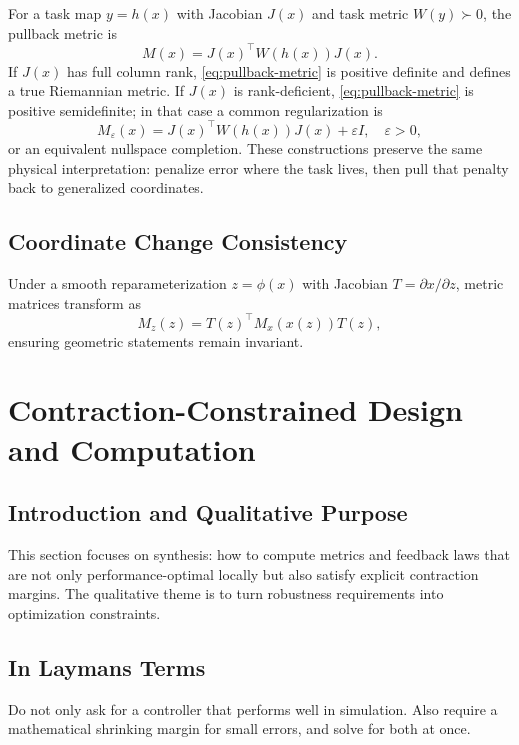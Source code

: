 \documentclass[11pt,letterpaper]{article}
\begin{document}
For a task map $y=h(x)$ with Jacobian $J(x)$ and task metric $W(y)\succ0$, the pullback metric is
\begin{equation}
M(x) = J(x)^\top W(h(x))J(x).
\label{eq:pullback-metric}
\end{equation}
If $J(x)$ has full column rank, \eqref{eq:pullback-metric} is positive definite and defines a true Riemannian metric. If $J(x)$ is rank-deficient, \eqref{eq:pullback-metric} is positive semidefinite; in that case a common regularization is
\begin{equation}
M_\varepsilon(x) = J(x)^\top W(h(x))J(x) + \varepsilon I,
\quad \varepsilon>0,
\label{eq:pullback-regularized}
\end{equation}
or an equivalent nullspace completion. These constructions preserve the same physical interpretation: penalize error where the task lives, then pull that penalty back to generalized coordinates.

\subsection{Coordinate Change Consistency}
Under a smooth reparameterization $z=\phi(x)$ with Jacobian $T=\partial x/\partial z$, metric matrices transform as
\begin{equation}
M_z(z) = T(z)^\top M_x(x(z))T(z),
\label{eq:metric-transform}
\end{equation}
ensuring geometric statements remain invariant.

\section{Contraction-Constrained Design and Computation}

\subsection{Introduction and Qualitative Purpose}
This section focuses on synthesis: how to compute metrics and feedback laws that are not only performance-optimal locally but also satisfy explicit contraction margins. The qualitative theme is to turn robustness requirements into optimization constraints.

\subsection{In Laymans Terms}
Do not only ask for a controller that performs well in simulation. Also require a mathematical shrinking margin for small errors, and solve for both at once.
\end{document}
